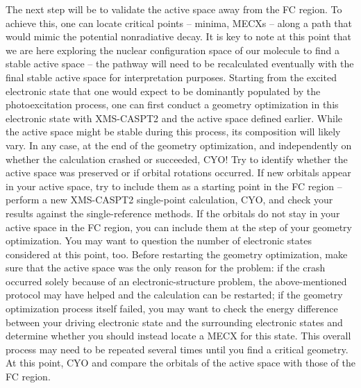 \documentclass[9pt,bestpractices]{livecoms}
\begin{document}
The next step will be to validate the active space away from the FC region. To achieve this, one can locate critical points -- minima, MECXs -- along a path that would mimic the potential nonradiative decay. It is key to note at this point that we are here exploring the nuclear configuration space of our molecule to find a stable active space -- the pathway will need to be recalculated eventually with the final stable active space for interpretation purposes. Starting from the excited electronic state that one would expect to be dominantly populated by the photoexcitation process, one can first conduct a geometry optimization in this electronic state with XMS-CASPT2 and the active space defined earlier. While the active space might be stable during this process, its composition will likely vary. In any case, at the end of the geometry optimization, and independently on whether the calculation crashed or succeeded, CYO! Try to identify whether the active space was preserved or if orbital rotations occurred. If new orbitals appear in your active space, try to include them as a starting point in the FC region -- perform a new XMS-CASPT2 single-point calculation, CYO, and check your results against the single-reference methods. If the orbitals do not stay in your active space in the FC region, you can include them at the step of your geometry optimization. You may want to question the number of electronic states considered at this point, too.
Before restarting the geometry optimization, make sure that the active space was the only reason for the problem: if the crash occurred solely because of an electronic-structure problem, the above-mentioned protocol may have helped and the calculation can be restarted; if the geometry optimization process itself failed, you may want to check the energy difference between your driving electronic state and the surrounding electronic states and determine whether you should instead locate a MECX for this state. This overall process may need to be repeated several times until you find a critical geometry. At this point, CYO and compare the orbitals of the active space with those of the FC region. 
\end{document}

